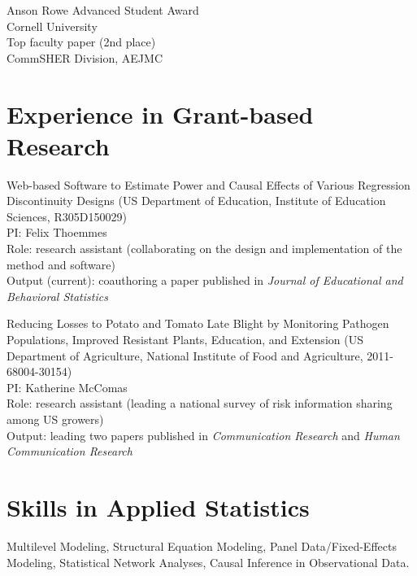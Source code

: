 \documentclass[11pt, letterpaper]{article} %
\newcommand{\years}[1]{\leavevmode\marginnote{\scriptsize #1}} %
\begin{document}
Anson Rowe Advanced Student Award \years{2016} \\ 
\textsf{Cornell University} \\

Top faculty paper (2nd place) \years{2015} \\
\textsf{CommSHER Division, AEJMC}


\section*{Experience in Grant-based Research}

Web-based \years{2015-} Software to Estimate Power and Causal Effects of Various Regression Discontinuity Designs (US Department of Education, Institute of Education Sciences, R305D150029)  \\
\textsf{
PI: Felix Thoemmes\\
Role: research assistant (collaborating on the design and implementation of the method and software)\\
Output (current): coauthoring a paper published in \textsl{Journal of Educational and Behavioral Statistics}
}

Reducing \years{2013-2015} Losses to Potato and Tomato Late Blight by Monitoring Pathogen Populations, Improved Resistant Plants, Education, and Extension (US Department of Agriculture, National Institute of Food and Agriculture, 2011-68004-30154) \\
\textsf{
PI: Katherine McComas\\
Role: research assistant (leading a national survey of risk information sharing among US growers)\\
Output: leading two papers published in \textsl{Communication Research} and \textsl{Human Communication Research}
}

\section*{Skills in Applied Statistics}

Multilevel Modeling, Structural Equation Modeling, Panel Data/Fixed-Effects Modeling, Statistical Network Analyses, Causal Inference in Observational Data.

\end{document}
